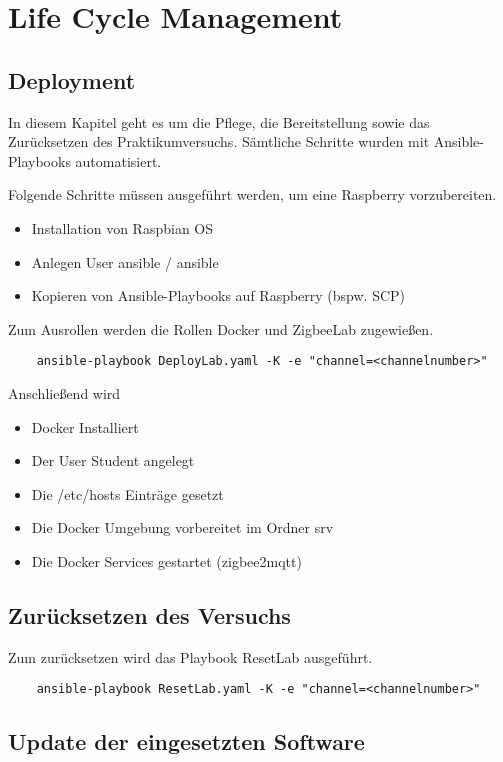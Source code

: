\chapter{Life Cycle Management}
\section{Deployment}
In diesem Kapitel geht es um die Pflege, die Bereitstellung sowie das Zurücksetzen des Praktikumversuchs. Sämtliche Schritte wurden mit Ansible-Playbooks
automatisiert.

Folgende Schritte müssen ausgeführt werden, um eine Raspberry vorzubereiten.
\begin{itemize}
    \item Installation von Raspbian OS
    \item Anlegen User ansible / ansible
    \item Kopieren von Ansible-Playbooks auf Raspberry (bspw. SCP)
\end{itemize}

Zum Ausrollen werden die Rollen \grqq Docker\grqq{} und \grqq ZigbeeLab\grqq{} zugewießen.
\begin{lstlisting}
    ansible-playbook DeployLab.yaml -K -e "channel=<channelnumber>"
\end{lstlisting}

Anschließend wird
\begin{itemize}
    \item Docker Installiert
    \item Der User Student angelegt
    \item Die /etc/hosts Einträge gesetzt
    \item Die Docker Umgebung vorbereitet im Ordner srv
    \item Die Docker Services gestartet (zigbee2mqtt)
\end{itemize}

\section{Zurücksetzen des Versuchs}

Zum zurücksetzen wird das Playbook \grqq ResetLab\grqq{} ausgeführt.

\begin{lstlisting}
    ansible-playbook ResetLab.yaml -K -e "channel=<channelnumber>"
\end{lstlisting}

\section{Update der eingesetzten Software}


